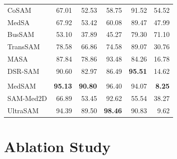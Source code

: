 \documentclass[10pt]{article}
\begin{document}
{\begin{longtable}{lrrrrr}
CoSAM & 67.01 & 52.53 & 58.75 & 91.52 & 54.52 \\
MedSA & 67.92 & 53.42 & 60.08 & 89.47 & 47.99 \\
BusSAM & 53.10 & 37.89 & 45.27 & 79.30 & 71.10 \\
TransSAM & 78.58 & 66.86 & 74.58 & 89.07 & 30.76 \\
MASA & 87.84 & 78.86 & 93.48 & 84.26 & 16.78 \\
DSR-SAM & 90.60 & 82.97 & 86.49 & \textbf{95.51} & 14.62 \\
\addlinespace[2pt]
\multicolumn{6}{l}{\textit{Zero-shot foundation models}} \\
MedSAM & \textbf{95.13} & \textbf{90.80} & 96.40 & 94.07 & \textbf{8.25} \\
SAM-Med2D & 66.89 & 53.45 & 92.62 & 55.54 & 38.27 \\
UltraSAM & 94.39 & 89.50 & \textbf{98.46} & 90.83 & 9.62 \\
\end{longtable}
}


\section{Ablation Study}
\label{sec:ablation}
\end{document}
